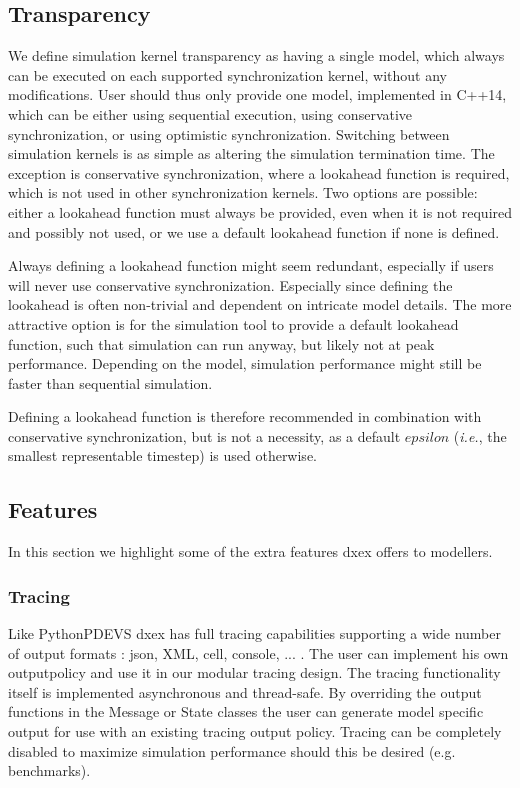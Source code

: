 \subsection{Transparency}
We define simulation kernel transparency as having a single model, which always can be executed on each supported synchronization kernel, without any modifications.
User should thus only provide one model, implemented in C++14, which can be either using sequential execution, using conservative synchronization, or using optimistic synchronization.
Switching between simulation kernels is as simple as altering the simulation termination time.
The exception is conservative synchronization, where a lookahead function is required, which is not used in other synchronization kernels.
Two options are possible: either a lookahead function must always be provided, even when it is not required and possibly not used, or we use a default lookahead function if none is defined.

Always defining a lookahead function might seem redundant, especially if users will never use conservative synchronization.
Especially since defining the lookahead is often non-trivial and dependent on intricate model details.
The more attractive option is for the simulation tool to provide a default lookahead function, such that simulation can run anyway, but likely not at peak performance.
Depending on the model, simulation performance might still be faster than sequential simulation. 

Defining a lookahead function is therefore recommended in combination with conservative synchronization, but is not a necessity, as a default $epsilon$ (\textit{i.e.}, the smallest representable timestep) is used otherwise.

\subsection{Features}
In this section we highlight some of the extra features dxex offers to modellers.
\subsubsection{Tracing}
Like PythonPDEVS dxex has full tracing capabilities supporting a wide number of output formats : json, XML, cell, console, ... . The user can implement his own outputpolicy and use it in our modular tracing design. The tracing functionality itself is implemented asynchronous and thread-safe. By overriding the output functions in the Message or State classes the user can generate model specific output for use with an existing tracing output policy. Tracing can be completely disabled to maximize simulation performance should this be desired (e.g. benchmarks). 
